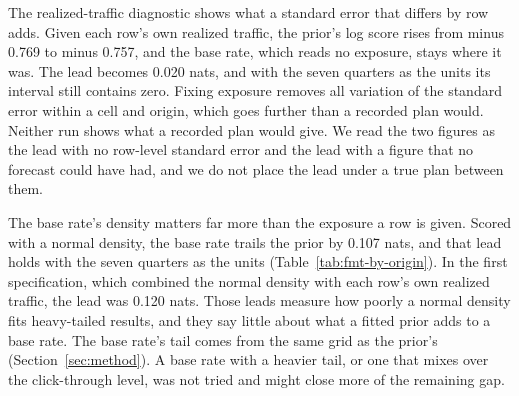 The realized-traffic diagnostic shows what a standard error that differs by row adds. Given each row's own realized traffic, the prior's log score rises from minus 0.769 to minus 0.757, and the base rate, which reads no exposure, stays where it was. The lead becomes 0.020 nats, and with the seven quarters as the units its interval still contains zero. Fixing exposure removes all variation of the standard error within a cell and origin, which goes further than a recorded plan would. Neither run shows what a recorded plan would give. We read the two figures as the lead with no row-level standard error and the lead with a figure that no forecast could have had, and we do not place the lead under a true plan between them.

The base rate's density matters far more than the exposure a row is given. Scored with a normal density, the base rate trails the prior by 0.107 nats, and that lead holds with the seven quarters as the units (Table~\ref{tab:fmt-by-origin}). In the first specification, which combined the normal density with each row's own realized traffic, the lead was 0.120 nats. Those leads measure how poorly a normal density fits heavy-tailed results, and they say little about what a fitted prior adds to a base rate. The base rate's tail comes from the same grid as the prior's (Section~\ref{sec:method}). A base rate with a heavier tail, or one that mixes over the click-through level, was not tried and might close more of the remaining gap.

